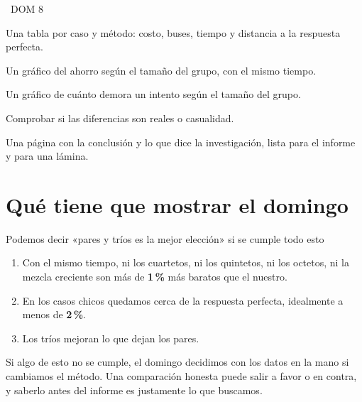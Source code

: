 \documentclass[11pt,a4paper]{article}
\newcommand{\dia}[2]{%
  \vspace{0.6em}\noindent
  \colorbox{azul}{\color{white}\bfseries\strut\ #1\ }\hspace{0.6em}{\bfseries\color{azul}#2}\par\vspace{0.2em}}
\begin{document}
\dia{DOM 8}{Conclusión}
\begin{tareas}
  \item Una tabla por caso y método: costo, buses, tiempo y distancia a la respuesta perfecta.
  \item Un gráfico del ahorro según el tamaño del grupo, con el mismo tiempo.
  \item Un gráfico de cuánto demora un intento según el tamaño del grupo.
  \item Comprobar si las diferencias son reales o casualidad.
  \item Una página con la conclusión y lo que dice la investigación, lista para el informe y para una lámina.
\end{tareas}

\section{Qué tiene que mostrar el domingo}

\begin{meta}{Podemos decir «pares y tríos es la mejor elección» si se cumple todo esto}
\begin{enumerate}[leftmargin=1.4em, itemsep=0.3em]
  \item Con el mismo tiempo, ni los cuartetos, ni los quintetos, ni los octetos, ni la mezcla creciente son más de \textbf{1\,\%} más baratos que el nuestro.
  \item En los casos chicos quedamos cerca de la respuesta perfecta, idealmente a menos de \textbf{2\,\%}.
  \item Los tríos mejoran lo que dejan los pares.
\end{enumerate}
\end{meta}

Si algo de esto no se cumple, el domingo decidimos con los datos en la mano si cambiamos el método. Una comparación honesta puede salir a favor o en contra, y saberlo antes del informe es justamente lo que buscamos.
\end{document}

